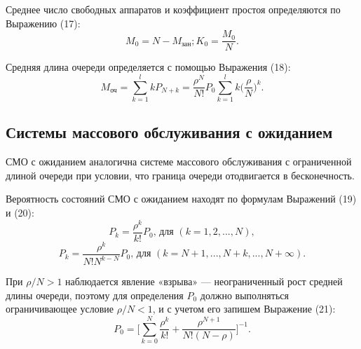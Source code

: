 \documentclass[14pt]{extarticle}
\begin{document}
    Среднее число свободных аппаратов и коэффициент простоя определяются  по Выражению (17):
    \begin{equation}
        M_0 = N - M_{\text{зан}}; K_0 = \frac{M_0}{N}.
    \end{equation}

    Средняя длина очереди определяется с помощью Выражения (18):
    \begin{equation}
        M_{\text{оч}} = \sum_{k = 1}^l k P_{N + k} = \frac{\rho^N}{N!} P_0 \sum_{k = 1}^l k \Bigg( \frac{\rho}{N} \Bigg)^k.
    \end{equation}

    \subsection{Системы массового обслуживания с ожиданием}

    СМО с ожиданием аналогична системе массового обслуживания с ограниченной длиной очереди при условии, что граница очереди отодвигается в бесконечность.

    Вероятность состояний СМО с ожиданием находят по формулам Выражений (19) и (20):
    \begin{equation}
        P_k = \frac{\rho^k}{k!} P_0\text{, для }(k = 1, 2, ..., N),
    \end{equation}
    \begin{equation}
        P_k = \frac{\rho^k}{N! N^{k - N}} P_0\text{, для } (k = N + 1, ..., N + k, ..., N + \infty).
    \end{equation}

    При $\rho / N > 1$ наблюдается явление «взрыва» --- неограниченный рост средней длины очереди, поэтому для определения $P_0$ должно выполняться ограничивающее условие $ \rho / N < 1 $, и с учетом его запишем Выражение (21):
    \begin{equation}
        P_0 = \Bigg[ \sum_{k = 0}^N \frac{\rho^k}{k!} + \frac{\rho^{N + 1}}{N!(N - \rho)}  \Bigg]^{-1}.
    \end{equation}
\end{document}
